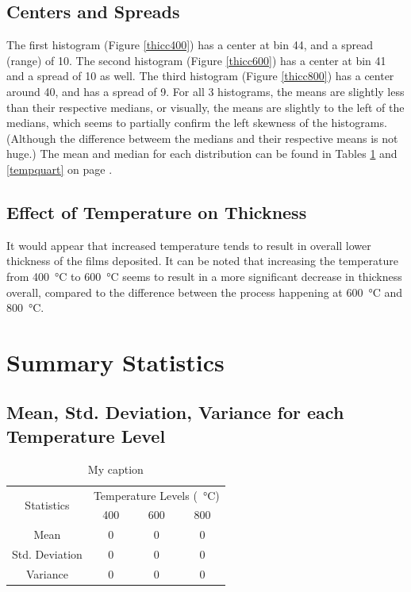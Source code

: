 \documentclass[letterpaper]{article}
\begin{document}
\subsection{Centers and Spreads}
The first histogram (Figure \ref{thicc400}) has a center at bin 44, and a spread (range) of 10.
The second histogram (Figure \ref{thicc600}) has a center at bin 41 and a spread of 10 as well.
The third histogram (Figure \ref{thicc800}) has a center around 40, and has a spread of 9.
For all 3 histograms, the means are slightly less than their respective medians, or visually,
the means are slightly to the left of the medians, which seems to partially confirm
the left skewness of the histograms. (Although the difference betweem the medians and their
respective means is not huge.) The mean and median for each distribution can be found in Tables
\ref{tempmean} and \ref{tempquart} on page \pageref{tempmean}.


\subsection{Effect of Temperature on Thickness}
It would appear that increased temperature tends to result in overall lower thickness
of the films deposited. It can be noted that increasing the temperature from
\SI{400}{\celsius} to \SI{600}{\celsius} seems to result in a more significant decrease
in thickness overall, compared to the difference between the process happening at
\SI{600}{\celsius} and \SI{800}{\celsius}.

\section{Summary Statistics}

\subsection{Mean, Std. Deviation, Variance for each Temperature Level}

\begin{table}[H]
 \centering
 \begin{tabular}{c|c|c|c|}
  \multirow{2}{*}{Statistics} & \multicolumn{3}{c|}{Temperature Levels (\SI{}{\celsius})}             \\ \cline{2-4}
                              & 400                                                       & 600 & 800 \\ \hline
  Mean                        & 0                                                         & 0   & 0   \\ \hline
  Std. Deviation              & 0                                                         & 0   & 0   \\ \hline
  Variance                    & 0                                                         & 0   & 0   \\ \hline
 \end{tabular}
 \caption{My caption}
 \label{tempmean}
\end{table}
\end{document}
